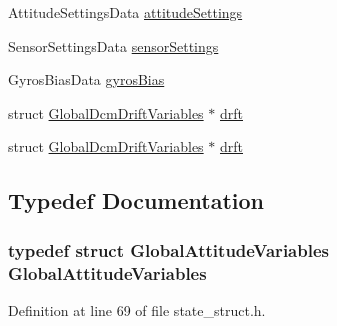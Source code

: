\begin{DoxyCompactItemize}
\-Attitude\-Settings\-Data \hyperlink{group___state_estimation_filters_ga8f6543ab52bafea6c0858baeeae8db59}{attitude\-Settings}
\item 
\-Sensor\-Settings\-Data \hyperlink{group___state_estimation_filters_ga7e2b26cdc0322ab9457559aa2b94f8fc}{sensor\-Settings}
\item 
\-Gyros\-Bias\-Data \hyperlink{group___state_estimation_filters_ga233a2d6850e9c466f80ae6bb2ebd98e8}{gyros\-Bias}
\item 
struct \hyperlink{struct_global_dcm_drift_variables}{\-Global\-Dcm\-Drift\-Variables} $\ast$ \hyperlink{group___state_estimation_filters_ga89657be5e41cdb8b74d42e587333115a}{drft}
\item 
struct \hyperlink{struct_global_dcm_drift_variables}{\-Global\-Dcm\-Drift\-Variables} $\ast$ \hyperlink{group___state_estimation_filters_ga89657be5e41cdb8b74d42e587333115a}{drft}
\end{DoxyCompactItemize}


\subsection{\-Typedef \-Documentation}
\hypertarget{group___state_estimation_filters_ga02f6c6dfdf0ff8ff2b30b24205c6b1f8}{
\subsubsection[{\-Global\-Attitude\-Variables}]{\setlength{\rightskip}{0pt plus 5cm}typedef struct {\bf \-Global\-Attitude\-Variables} {\bf \-Global\-Attitude\-Variables}}}\label{group___state_estimation_filters_ga02f6c6dfdf0ff8ff2b30b24205c6b1f8}


\-Definition at line 69 of file state\-\_\-struct.\-h.



